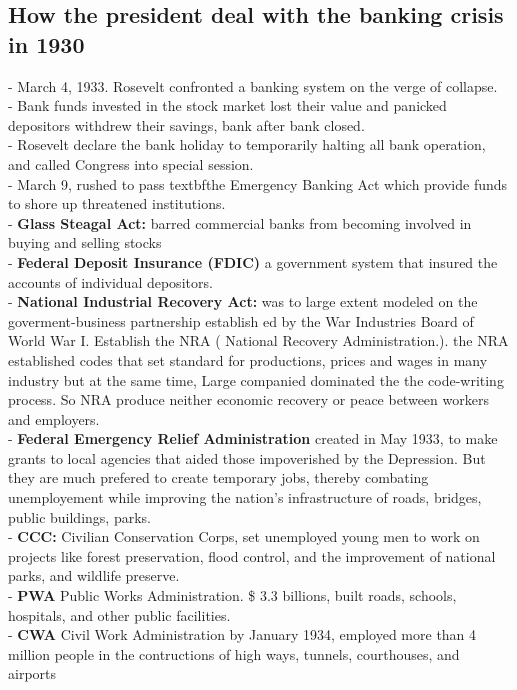\documentclass{article}
\begin{document}
\subsection{ How the president deal with the banking crisis in 1930}
- March 4, 1933. Rosevelt confronted a banking system on the verge of collapse.\\
- Bank funds invested in the stock market lost their value and panicked depositors withdrew their savings, bank after bank closed.\\
- Rosevelt declare the bank holiday to temporarily halting all bank operation, and called Congress into special session. \\
- March 9, rushed to pass textbf{the Emergency Banking Act} which provide  funds to shore up threatened institutions.\\
- \textbf{Glass Steagal Act: } barred commercial banks from becoming involved in buying and selling stocks\\
- \textbf{ Federal Deposit Insurance (FDIC)} a government system that insured the accounts of individual depositors.\\
- \textbf{National Industrial Recovery Act: } was to large extent modeled on the
goverment-business partnership establish ed by the War Industries Board of World War I. Establish the NRA ( National Recovery Administration.). the NRA established codes that set standard for productions, prices and wages in many industry but at the same time, Large companied dominated the the code-writing process. So NRA produce neither economic recovery or peace between workers and employers. \\
- \textbf{Federal Emergency Relief Administration} created in May 1933, to make grants to local agencies that aided those impoverished by the Depression. But they are much prefered to create temporary jobs, thereby combating unemployement while improving the nation's infrastructure of roads, bridges, public buildings, parks.\\
- \textbf{CCC:} Civilian Conservation Corps, set unemployed young men to work on projects like forest preservation, flood control, and the improvement of national parks, and wildlife preserve.\\
- \textbf{PWA} Public Works Administration. \$ 3.3 billions, built roads, schools, hospitals, and other public facilities.\\
- \textbf{ CWA} Civil Work Administration by January 1934, employed more than 4 million people in the contructions of high ways, tunnels, courthouses, and airports\\ 
\end{document}
